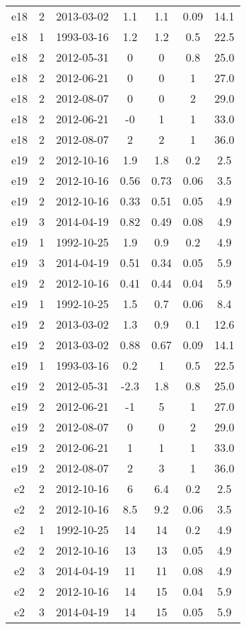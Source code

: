 \begin{table*}[htp]
\begin{tabular}{ccccccc}
e18 & 2 & 2013-03-02 & 1.1 & 1.1 & 0.09 & 14.1 \\
e18 & 1 & 1993-03-16 & 1.2 & 1.2 & 0.5 & 22.5 \\
e18 & 2 & 2012-05-31 & 0 & 0 & 0.8 & 25.0 \\
e18 & 2 & 2012-06-21 & 0 & 0 & 1 & 27.0 \\
e18 & 2 & 2012-08-07 & 0 & 0 & 2 & 29.0 \\
e18 & 2 & 2012-06-21 & -0 & 1 & 1 & 33.0 \\
e18 & 2 & 2012-08-07 & 2 & 2 & 1 & 36.0 \\
e19 & 2 & 2012-10-16 & 1.9 & 1.8 & 0.2 & 2.5 \\
e19 & 2 & 2012-10-16 & 0.56 & 0.73 & 0.06 & 3.5 \\
e19 & 2 & 2012-10-16 & 0.33 & 0.51 & 0.05 & 4.9 \\
e19 & 3 & 2014-04-19 & 0.82 & 0.49 & 0.08 & 4.9 \\
e19 & 1 & 1992-10-25 & 1.9 & 0.9 & 0.2 & 4.9 \\
e19 & 3 & 2014-04-19 & 0.51 & 0.34 & 0.05 & 5.9 \\
e19 & 2 & 2012-10-16 & 0.41 & 0.44 & 0.04 & 5.9 \\
e19 & 1 & 1992-10-25 & 1.5 & 0.7 & 0.06 & 8.4 \\
e19 & 2 & 2013-03-02 & 1.3 & 0.9 & 0.1 & 12.6 \\
e19 & 2 & 2013-03-02 & 0.88 & 0.67 & 0.09 & 14.1 \\
e19 & 1 & 1993-03-16 & 0.2 & 1 & 0.5 & 22.5 \\
e19 & 2 & 2012-05-31 & -2.3 & 1.8 & 0.8 & 25.0 \\
e19 & 2 & 2012-06-21 & -1 & 5 & 1 & 27.0 \\
e19 & 2 & 2012-08-07 & 0 & 0 & 2 & 29.0 \\
e19 & 2 & 2012-06-21 & 1 & 1 & 1 & 33.0 \\
e19 & 2 & 2012-08-07 & 2 & 3 & 1 & 36.0 \\
e2 & 2 & 2012-10-16 & 6 & 6.4 & 0.2 & 2.5 \\
e2 & 2 & 2012-10-16 & 8.5 & 9.2 & 0.06 & 3.5 \\
e2 & 1 & 1992-10-25 & 14 & 14 & 0.2 & 4.9 \\
e2 & 2 & 2012-10-16 & 13 & 13 & 0.05 & 4.9 \\
e2 & 3 & 2014-04-19 & 11 & 11 & 0.08 & 4.9 \\
e2 & 2 & 2012-10-16 & 14 & 15 & 0.04 & 5.9 \\
e2 & 3 & 2014-04-19 & 14 & 15 & 0.05 & 5.9 \\

\end{tabular}
\end{table*}
